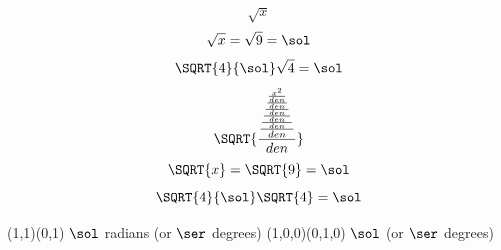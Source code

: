 \documentclass{article}
\let\calcSQRT\SQRT
\begin{document}
\[ \sqrt{x} \]
\calcSQRT{9}{\sol}
\[ \sqrt{x} = \sqrt{9} = \sol \]
\[ \calcSQRT{4}{\sol}\sqrt{4} = \sol \]
\[ \SQRT{\frac{\frac{\frac{\frac{\frac{\frac{\frac{x^2}{den}}{den}}{den}}{den}}{den}}{den}}{den}} \]
\calcSQRT{9}{\sol}
\[ \SQRT{x} = \SQRT{9} = \sol \]
\[ \calcSQRT{4}{\sol}\SQRT{4} = \sol \]

\TWOVECTORSANGLE(1,1)(0,1){\sol}
$\sol$ radians
\RADtoDEG{\sol}{\degsol}\ROUND[0]{\degsol}{\ser}
(or $\ser$ degrees)
\TWOVECTORSANGLE(1,0,0)(0,1,0){\sol}
$\sol$
\RADtoDEG{\sol}{\degsol}\ROUND[0]{\degsol}{\ser}
(or $\ser$ degrees)
\end{document}
